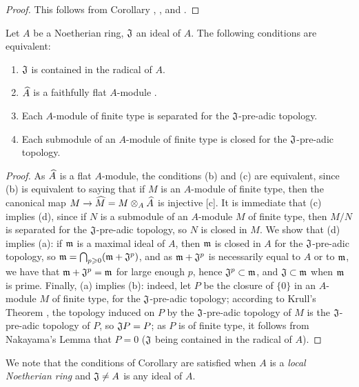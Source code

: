 \begin{proof}
\label{proof-0.7.3.4}
This follows from Corollary , ,
and .
\end{proof}

\begin{cor}[7.3.5]
\label{0.7.3.5}
Let $A$ be a Noetherian ring, $\mathfrak{J}$ an ideal of $A$. The following conditions are
equivalent:
\begin{enumerate}[label=\emph{(\alph*)}]
  \item $\mathfrak{J}$ is contained in the radical of $A$.
  \item $\widehat{A}$ is a faithfully flat $A$-module .
  \item Each $A$-module of finite type is separated for the $\mathfrak{J}$-pre-adic topology.
  \item Each submodule of an $A$-module of finite type is closed for the $\mathfrak{J}$-pre-adic topology.
\end{enumerate}
\end{cor}

\begin{proof}
\label{proof-0.7.3.5}
As $\widehat{A}$ is a flat $A$-module, the conditions (b) and (c) are equivalent, since
(b) is equivalent to saying that if $M$ is an $A$-module of finite type, then the canonical
map $M\to\wh{M}=M\otimes_A\wh{A}$ is injective [c].
It is immediate that (c) implies (d), since if $N$ is a submodule of an $A$-module $M$ of
finite type, then $M/N$ is separated for the $\mathfrak{J}$-pre-adic topology, so $N$ is
closed in $M$. We show that (d) implies (a): if $\mathfrak{m}$ is a maximal ideal of $A$,
then $\mathfrak{m}$ is closed in $A$ for the $\mathfrak{J}$-pre-adic topology, so
$\mathfrak{m}=\bigcap_{p\geqslant 0}(\mathfrak{m}+\mathfrak{J}^p)$, and as
$\mathfrak{m}+\mathfrak{J}^p$ is necessarily equal to $A$ or to $\mathfrak{m}$, we have that
$\mathfrak{m}+\mathfrak{J}^p=\mathfrak{m}$ for large enough $p$,
hence $\mathfrak{J}^p\subset\mathfrak{m}$, and $\mathfrak{J}\subset\mathfrak{m}$ when
$\mathfrak{m}$ is prime. Finally, (a) implies (b): indeed, let $P$ be the closure of $\{0\}$
in an $A$-module $M$ of finite type, for the $\mathfrak{J}$-pre-adic topology; according to
Krull's Theorem , the topology induced on $P$ by the
$\mathfrak{J}$-pre-adic topology of $M$ is the $\mathfrak{J}$-pre-adic topology of $P$,
so $\mathfrak{J}P=P$; as $P$ is of finite type, it follows from Nakayama's Lemma that
$P=0$ ($\mathfrak{J}$ being contained in the radical of $A$).
\end{proof}

We note that the conditions of Corollary  are satisfied
when $A$ is a \emph{local Noetherian ring} and $\mathfrak{J}\neq A$ is any ideal of $A$.

